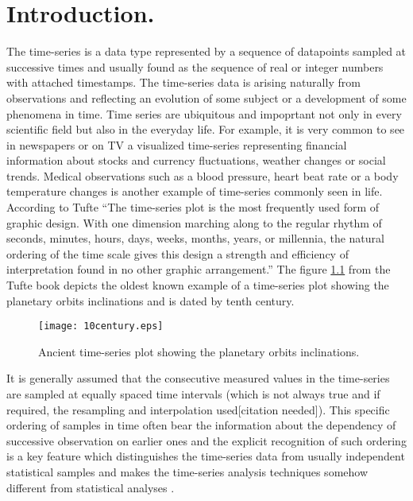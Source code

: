 \chapter{Introduction.}
The time-series is a data type represented by a sequence of datapoints sampled at successive times and usually found as the sequence of real or integer numbers with attached timestamps. The time-series data is arising naturally from observations and reflecting an evolution of some subject or a development of some phenomena in time. Time series are ubiquitous and impoprtant not only in every scientific field but also in the everyday life. For example, it is very common to see in newspapers or on TV a visualized time-series representing financial information about stocks and currency fluctuations, weather changes or social trends. Medical observations such as a blood pressure, heart beat rate or a body temperature changes is another example of time-series commonly seen in life. According to Tufte \cite{citeulike:1454223} ``The time-series plot is the most frequently used form of graphic design. With one dimension marching along to the regular rhythm of seconds, minutes, hours, days, weeks, months, years, or millennia, the natural ordering of the time scale gives this design a strength and efficiency of interpretation found in no other graphic arrangement.'' The figure \ref{fig:10century} from the Tufte book depicts the oldest known example of a time-series plot showing the planetary orbits inclinations and is dated by tenth century.

\begin{figure}[tbp]
   \centering
   \texttt{[image: 10century.eps]}
   \caption{Ancient time-series plot showing the planetary orbits inclinations.}
   \label{fig:10century}
\end{figure} 

It is generally assumed that the consecutive measured values in the time-series are sampled at equally spaced time intervals (which is not always true and if required, the resampling and interpolation used[citation needed]). This specific ordering of samples in time often bear the information about the dependency of successive observation on earlier ones and the explicit recognition of such ordering is a key feature which distinguishes the time-series data from usually independent statistical samples and makes the time-series analysis techniques somehow different from statistical analyses \cite{citeulike:3989988}. 

